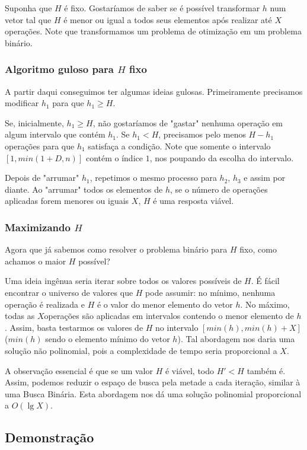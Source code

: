 Suponha que $H$ é fixo. Gostaríamos de saber se é possível transformar $h$ num vetor tal que $H$ é menor ou igual a todos seus elementos após realizar até $X$ operações. Note que transformamos um problema de otimização em um problema binário.

\subsubsection*{Algoritmo guloso para $H$ fixo}\label{subproblema:algo}

A partir daqui conseguimos ter algumas ideias gulosas. Primeiramente precisamos modificar $h_1$ para que $h_1 \geq H$.

Se, inicialmente, $h_1 \geq H$, não gostaríamos de "gastar" nenhuma operação em algum intervalo que contém $h_1$. Se $h_1 < H$, precisamos pelo menos $H - h_1$ operações para que $h_1$ satisfaça a condição. Note que somente o intervalo $[1, min(1 + D, n)]$ contém o índice $1$, nos poupando da escolha do intervalo.

Depois de "arrumar" $h_1$, repetimos o mesmo processo para $h_2$, $h_3$ e assim por diante. Ao "arrumar" todos os elementos de $h$, se o número de operações aplicadas forem menores ou iguais $X$, $H$ é uma resposta viável.

\subsubsection*{Maximizando $H$}

Agora que já sabemos como resolver o problema binário para $H$ fixo, como achamos o maior $H$ possível?

Uma ideia ingênua seria iterar sobre todos os valores possíveis de $H$. É fácil encontrar o universo de valores que $H$ pode assumir: no mínimo, nenhuma operação é realizada e $H$ é o valor do menor elemento do vetor $h$. No máximo, todas as $X$operações são aplicadas em intervalos contendo o menor elemento de $h$. Assim, basta testarmos os valores de $H$ no intervalo $[min(h), min(h) + X]$ ($min(h)$ sendo o elemento mínimo do vetor $h$). Tal abordagem nos daria uma solução não polinomial, pois a complexidade de tempo seria proporcional a $X$.

A observação essencial é que se um valor $H$ é viável, todo $H' < H$ também é. Assim, podemos reduzir o espaço de busca pela metade a cada iteração, similar à uma Busca Binária. Esta abordagem nos dá uma solução polinomial proporcional a $O(\lg X)$.

\subsection*{Demonstração}

